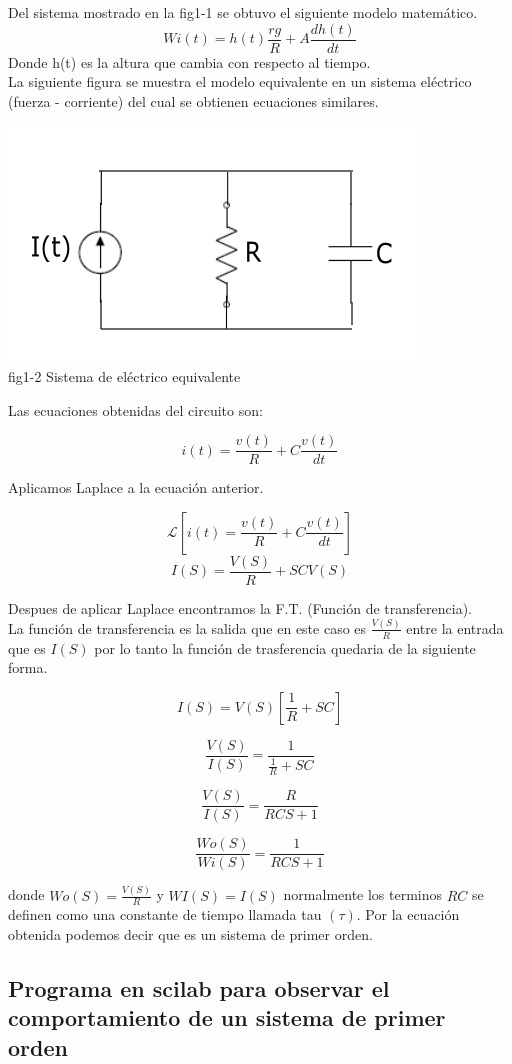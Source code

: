 \documentclass[12pt,a4paper]{IEEEtran}
\begin{document}
Del sistema mostrado en la fig1-1 se obtuvo el siguiente modelo matemático.
$$Wi(t) = h(t)\frac{rg}{R} + A\frac{dh(t)}{dt}$$
Donde h(t) es la altura que cambia con respecto al tiempo.
\\  
La siguiente figura se muestra el modelo equivalente en un sistema eléctrico (fuerza - corriente) del cual se obtienen ecuaciones similares.

\begin{center}
	\includegraphics[scale = 0.5]{images/RCI}\\
	{fig1-2 Sistema de eléctrico equivalente}
\end{center}

Las ecuaciones obtenidas del circuito son:

$$i(t) = \frac{v(t)}{R} + C\frac{v(t)}{dt} $$

Aplicamos Laplace a la ecuación anterior.

$$\mathcal{L}[i(t) = \frac{v(t)}{R} + C\frac{v(t)}{dt}]$$
$$I(S) = \frac{V(S)}{R} + SCV(S) $$

Despues de aplicar Laplace encontramos la F.T. (Función de transferencia).\\
La función de transferencia es la salida que en este caso es $\frac{V(S)}{R}$ entre la entrada que es $I(S)$ por lo tanto la función de trasferencia quedaria de la siguiente forma.

$$I(S) = V(S)[\frac{1}{R}+ SC]$$

$$\frac{V(S)}{I(S)} = \frac{1}{\frac{1}{R} + SC}$$

$$\frac{V(S)}{I(S)} = \frac{R}{RCS + 1}$$

$$\frac{Wo(S)}{Wi(S)} = \frac{1}{RCS + 1}$$

donde $Wo(S) = \frac{V(S)}{R}$ y $WI(S) = I(S)$ normalmente los terminos $RC$ se definen como una constante de tiempo llamada tau $(\tau)$. Por la ecuación obtenida podemos decir que es un sistema de primer orden.
\subsection{Programa en scilab para observar el comportamiento de un sistema de primer orden}
\end{document}
